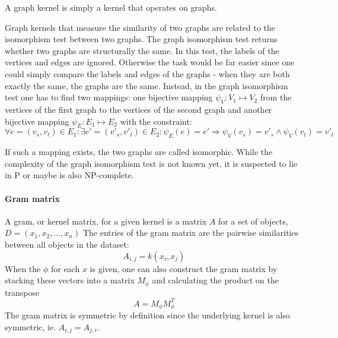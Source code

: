 A graph kernel is simply a kernel that operates on graphs.

Graph kernels that measure the similarity of two graphs are related to the isomorphism test between two graphs.
The graph isomorphism test returns whether two graphs are structurally the same.
In this test, the labels of the vertices and edges are ignored. Otherwise the task would be far easier since one could simply compare the labels and edges of the graphs - when they are both exactly the same, the graphs are the same.
Instead, in the graph isomorphism test one has to find two mappings: one bijective mapping $\psi_{V}: V_1 \mapsto V_2$ from the vertices of the first graph to the vertices of the second graph and another bijective mapping $\psi_{E}: E_1 \mapsto E_2$ with the constraint:
\begin{equation*}
    \forall e = (v_s, v_t) \in E_1:
    \exists e' = (v'_s, v'_t) \in E_2:
    \psi_{E}(e) = e'
    \Rightarrow
    \psi_{V}(v_s) = v'_s
    \land
    \psi_{V}(v_t) = v'_t
\end{equation*}


If such a mapping exists, the two graphs are called isomorphic.
While the complexity of the graph isomorphism test is not known yet, it is suspected to lie in P or maybe is also NP-complete.



\paragraph{Gram matrix}
A gram, or kernel matrix, for a given kernel is a matrix $A$ for a set of objects, $D = (x_1, x_2, \ldots, x_n)$
The entries of the gram matrix are the pairwise similarities between all objects in the dataset:
\begin{equation*}
    A_{i,j} = k(x_i, x_j)
\end{equation*}
When the $\phi$ for each $x$ is given, one can also construct the gram matrix by stacking these vectors into a matrix $M_{\phi}$ and calculating the product on the transpose
\begin{equation*}
    A = M_{\phi} M_{\phi}^T
\end{equation*}
The gram matrix is symmetric by definition since the underlying kernel is also symmetric, ie. $A_{i,j} = A_{j, i}$.

